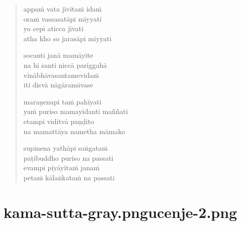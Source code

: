 

\cleartoverso

\vspace*{30mm}

\begin{verse}

appaṁ vata jīvitaṁ idaṁ\\
oraṁ vassasatāpi miyyati\\
yo cepi aticca jīvati\\
atha kho so jarasāpi miyyati

socanti janā mamāyite\\
na hi santi niccā pariggahā\\
vinābhāvasantamevidaṁ\\
iti disvā nāgāramāvase

maraṇenapi taṁ pahīyati\\
yaṁ puriso mamayidanti maññati\\
etampi viditvā paṇḍito\\
na mamattāya nametha māmako

supinena yathāpi saṅgataṁ\\
paṭibuddho puriso na passati\\
evampi piyāyitaṁ janaṁ\\
petaṁ kālaṅkataṁ na passati

\end{verse}


\chapter[Jarā Sutta]{{kama-sutta-gray.png}{ucenje-2.png}}


